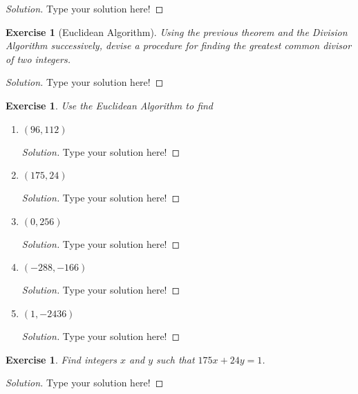 \documentclass[12pt,leqno]{article}
\numberwithin{equation}{section}
\newtheorem{exer}[thm]{Exercise}
\theoremstyle{definition}
\begin{document}
\begin{proof}[Solution]
Type your solution here!
\end{proof}

\begin{exer}[Euclidean Algorithm] Using the
previous theorem and the Division Algorithm successively, devise a
procedure for finding the greatest common divisor of two integers.
\end{exer}

\begin{proof}[Solution]
Type your solution here!
\end{proof}

\begin{exer}
Use the Euclidean Algorithm to find \end{exer}
\begin{enumerate}
    \item[(1)] $(96, 112)$
    \begin{proof}[Solution]
    Type your solution here!
    \end{proof}

    \item[(2)] $(175,24)$
    \begin{proof}[Solution]
    Type your solution here!
    \end{proof}

    \item[(3)] $(0,256)$
    \begin{proof}[Solution]
    Type your solution here!
    \end{proof}

    \item[(4)] $(-288, -166)$
    \begin{proof}[Solution]
    Type your solution here!
    \end{proof}

    \item[(5)] $(1,-2436)$
    \begin{proof}[Solution]
    Type your solution here!
    \end{proof}

\end{enumerate}

\begin{exer}
Find integers $x$ and $y$ such that $175x + 24y = 1$.
\end{exer}

\begin{proof}[Solution]
Type your solution here!
\end{proof}
\end{document}
